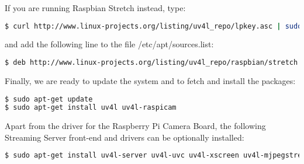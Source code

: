 If you are running Raspbian Stretch instead, type:
\begin{lstlisting}[language=bash]
$ curl http://www.linux-projects.org/listing/uv4l_repo/lpkey.asc | sudo apt-key add -
\end{lstlisting}

and add the following line to the file /etc/apt/sources.list:
\begin{lstlisting}[language=bash]
$ deb http://www.linux-projects.org/listing/uv4l_repo/raspbian/stretch stretch main
\end{lstlisting}

Finally, we are ready to update the system and to fetch and install the packages:
\begin{lstlisting}[language=bash]
$ sudo apt-get update
$ sudo apt-get install uv4l uv4l-raspicam
\end{lstlisting}

Apart from the driver for the Raspberry Pi Camera Board, the following Streaming Server front-end and drivers can be optionally installed:
\begin{lstlisting}[language=bash]
$ sudo apt-get install uv4l-server uv4l-uvc uv4l-xscreen uv4l-mjpegstream uv4l-dummy uv4l-raspidisp
\end{lstlisting}
